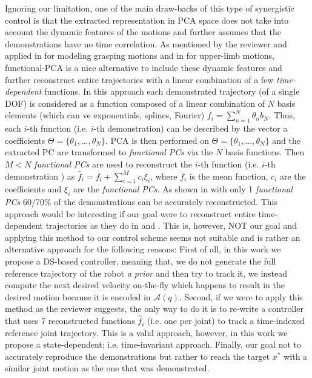 \documentclass{article}
\begin{document}
Ignoring our limitation, one of the main draw-backs of this type of synergistic control is that the extracted representation in PCA space does not take into account the dynamic features of the motions and further assumes that the demonstrations have no time correlation. As mentioned by the reviewer and applied in \cite{Dai:IROS:2013} for modeling grasping motions and in \cite{Averta:FRAI:2017} for upper-limb motions, functional-PCA is a nice alternative to include these dynamic features and further reconstruct entire trajectories with a linear combination of a few \textit{time-dependent} functions. In this approach each demonstrated trajectory (of a single DOF) is considered as a function composed of a linear combination of $N$ basis elements (which can ve exponentials, splines, Fourier) $f_i = \sum\limits_{n=1}^{N}\theta_nb_N$. Thus, each $i$-th function (i.e. $i$-th demonstration) can be described by the vector a coefficients $\Theta = \{\theta_1,\dots,\theta_N\}$. PCA is then performed on $\Theta = \{\theta_1,\dots,\theta_N\}$ and the extracted PC are transformed to \textit{functional PCs} via the $N$ basis functions. Then $M<N$ \textit{functional PCs} are used to reconstruct the $i$-th function (i.e. $i$-th demonstration ) as $\hat{f}_i = \bar{f_i} + \sum\limits_{i=1}^{M}c_i\xi_i$, where $\bar{f}_i$ is the mean function, $c_i$ are the coefficients and $\xi_i$ are the \textit{functional PCs}. As shown in \cite{Averta:FRAI:2017} with only 1 \textit{functional PCs} 60/70\% of the demonstrations can be accurately reconstructed. This approach would be interesting if our goal were to reconstruct entire time-dependent trajectories as they do in  \cite{Dai:IROS:2013} and \cite{Averta:FRAI:2017}. This is, however, NOT our goal and applying this method to our control scheme seems not suitable and is rather an alternative approach for the following reasons: First of all, in this work we propose a DS-based controller, meaning that, we do not generate the full reference trajectory of the robot \textit{a prior} and then try to track it, we instead compute the next desired velocity on-the-fly which happens to result in the desired motion because it is encoded in $\mathcal{A}(q)$. Second, if we were to apply this method as the reviewer suggests, the only way to do it is to re-write a controller that uses 7 reconstructed functions $\hat{f}_i$ (i.e. one per joint) to track a time-indexed reference joint trajectory. This is a valid approach, however, in this work we propose a state-dependent; i.e. time-invariant approach. Finally, our goal not to accurately reproduce the demonstrations but rather to reach the target $x^*$ with a similar joint motion as the one that was demonstrated.



\end{document}
